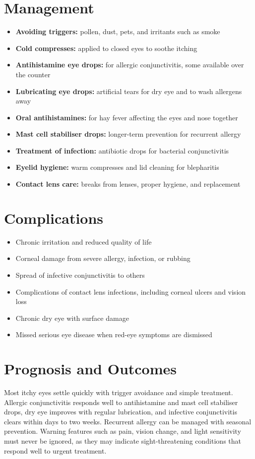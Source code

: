\section*{Management}
\begin{itemize}
    \item \textbf{Avoiding triggers:} pollen, dust, pets, and irritants such as smoke
    \item \textbf{Cold compresses:} applied to closed eyes to soothe itching
    \item \textbf{Antihistamine eye drops:} for allergic conjunctivitis, some available over the counter
    \item \textbf{Lubricating eye drops:} artificial tears for dry eye and to wash allergens away
    \item \textbf{Oral antihistamines:} for hay fever affecting the eyes and nose together
    \item \textbf{Mast cell stabiliser drops:} longer-term prevention for recurrent allergy
    \item \textbf{Treatment of infection:} antibiotic drops for bacterial conjunctivitis
    \item \textbf{Eyelid hygiene:} warm compresses and lid cleaning for blepharitis
    \item \textbf{Contact lens care:} breaks from lenses, proper hygiene, and replacement
\end{itemize}

\section*{Complications}
\begin{itemize}
    \item Chronic irritation and reduced quality of life
    \item Corneal damage from severe allergy, infection, or rubbing
    \item Spread of infective conjunctivitis to others
    \item Complications of contact lens infections, including corneal ulcers and vision loss
    \item Chronic dry eye with surface damage
    \item Missed serious eye disease when red-eye symptoms are dismissed
\end{itemize}

\section*{Prognosis and Outcomes}
Most itchy eyes settle quickly with trigger avoidance and simple treatment. Allergic conjunctivitis responds well to antihistamine and mast cell stabiliser drops, dry eye improves with regular lubrication, and infective conjunctivitis clears within days to two weeks. Recurrent allergy can be managed with seasonal prevention. Warning features such as pain, vision change, and light sensitivity must never be ignored, as they may indicate sight-threatening conditions that respond well to urgent treatment.

